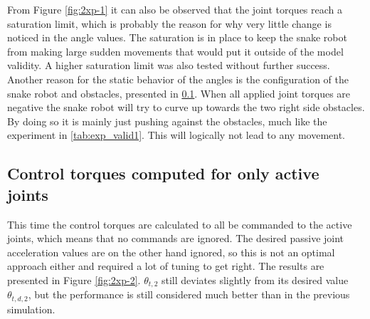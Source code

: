 From Figure \ref{fig:2xp-1} it can also be observed that the joint torques reach a saturation limit, which is probably the reason for why very little change is noticed in the angle values. The saturation is in place to keep the snake robot from making large sudden movements that would put it outside of the model validity. A higher saturation limit was also tested without further success. Another reason for the static behavior of the angles is the configuration of the snake robot and obstacles, presented in \ref{}. When all applied joint torques are negative the snake robot will try to curve up towards the two right side obstacles. By doing so it is mainly just pushing against the obstacles, much like the experiment in \ref{tab:exp_valid1}. This will logically not lead to any movement.

\subsection{Control torques computed for only active joints}

This time the control torques are calculated to all be commanded to the active joints, which means that no commands are ignored. The desired passive joint acceleration values are on the other hand ignored, so this is not an optimal approach either and required a lot of tuning to get right. The results are presented in Figure \ref{fig:2xp-2}. $\theta_{t,2}$ still deviates slightly from its desired value $\theta_{t,d,2}$, but the performance is still considered much better than in the previous simulation.

